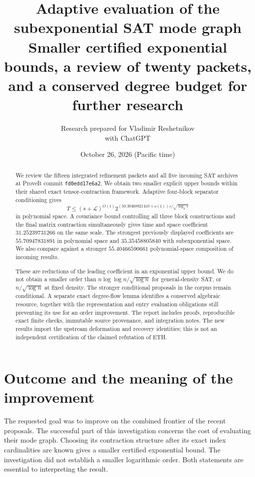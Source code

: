 \documentclass[11pt,letterpaper]{article}
\title{\textbf{Adaptive evaluation of the\\subexponential SAT mode graph}\\[6pt]\large Smaller certified exponential bounds, a review of twenty packets,\\and a conserved degree budget for further research}
\author{Research prepared for Vladimir Reshetnikov\\with ChatGPT}
\date{October 26, 2026 (Pacific time)}
\theoremstyle{remark}\newtheorem{remark}[theorem]{Remark}
\begin{document}
\maketitle
\begin{abstract}
We review the fifteen integrated refinement packets and all five incoming
SAT archives at ProveIt commit \texttt{fd0edd17e6a2}. We obtain two
smaller explicit upper bounds within their shared exact tensor-contraction
framework. Adaptive four-block separator conditioning gives
\[
 T\le (s+\mathcal L)^{O(1)}
 2^{(50.30468921410+o(1))s/\sqrt{\log_2s}}
\]
in polynomial space. A covariance bound controlling all three block constructions and the
final matrix contraction simultaneously gives time and space coefficient
$31.25239731266$ on the same scale. The strongest previously
displayed coefficients are $55.70947831891$ in polynomial space and
$35.35458805840$ with subexponential space. We also compare against a
stronger $55.40466590661$ polynomial-space composition of incoming results.

These are reductions of the leading coefficient in an exponential upper
bound. We do not obtain a smaller order than
$n\log\log n/\sqrt{\log n}$ for general-density SAT, or
$n/\sqrt{\log n}$ at fixed density. The stronger conditional proposals in
the corpus remain conditional. A separate exact degree-flow lemma identifies
a conserved algebraic resource, together with the representation and entry
evaluation obligations still preventing its use for an order improvement.
The report includes proofs, reproducible exact finite checks, immutable
source provenance, and integration notes. The new results import the
upstream deformation and recovery identities; this is not an independent
certification of the claimed refutation of ETH.
\end{abstract}
\clearpage
\tableofcontents
\clearpage

\section{Outcome and the meaning of the improvement}
\label{sec:outcome}

The requested goal was to improve on the combined frontier of the recent
proposals. The successful part of this investigation concerns the cost of
evaluating their mode graph. Choosing its contraction structure after its
exact index cardinalities are known gives a smaller certified exponential
bound. The investigation did not establish a smaller logarithmic order.
Both statements are essential to interpreting the result.
\end{document}
